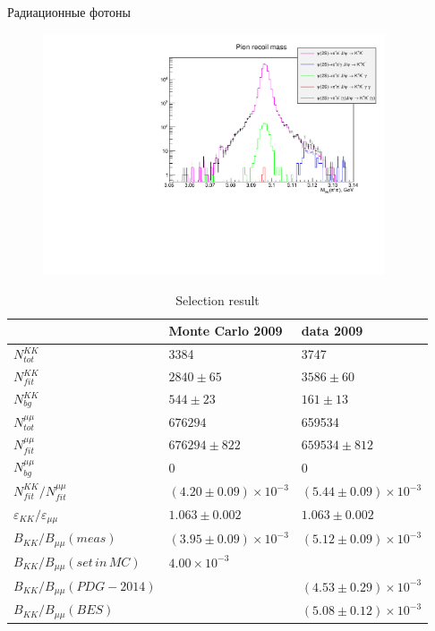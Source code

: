 \documentclass[unicode]{beamer}
\begin{document}
\begin{frame}
	
	\begin{block}{Радиационные фотоны}
\begin{figure}
	\includegraphics[width=0.9\textwidth]{fig/pion_recoil_radcor.pdf} \hfill
\end{figure}
\end{block}
\end{frame}

\begin{frame}
	\small
\begin{table}
  \centering
  \label{tab:res09}
  \caption{Selection result}
  \begin{tabular}{lll} 
                          & Monte Carlo 2009 & data 2009      \\  \hline
  $ N_{tot}^{KK}$         & 3384             &    3747        \\            
  $ N_{fit}^{KK}$         & $2840\pm65$      &    $3586\pm60$ \\
  $ N_{bg}^{KK}$          & $544\pm23$       &          $161 \pm 13$   \\
  $ N_{tot}^{\mu\mu}$     & $676294$         &       659534   \\
  $ N_{fit}^{\mu\mu}$     & $676294\pm822$   &       $659534 \pm 812$   \\
  $ N_{bg}^{\mu\mu}$      & $0           $   &       0    \\
  $ N_{fit}^{KK}/N_{fit}^{\mu\mu}$& $(4.20 \pm 0.09)\times10^{-3} $ & $(5.44 \pm 0.09)\times 10^{-3}$  \\
  $\varepsilon_{KK}/\varepsilon_{\mu\mu}$ & $1.063 \pm 0.002$ &  $1.063 \pm 0.002$  \\
  $ B_{KK}/B_{\mu\mu}(meas)$   & $(3.95 \pm 0.09)\times 10^{-3}$  & $(5.12 \pm 0.09)\times 10^{-3}$ \\
  $ B_{KK}/B_{\mu\mu}(set\,  in\,  MC)$   & $4.00\times 10^{-3}$  &  	\\ 
  $ B_{KK}/B_{\mu\mu}(PDG-2014)$   &                  & $(4.53 \pm 0.29)\times 10^{-3}$ \\
		$ B_{KK}/B_{\mu\mu}(BES)$   &                  &  $(5.08 \pm 0.12)\times 10^{-3}$ \\
\end{tabular}
\end{table}

\end{frame}
\end{document}
